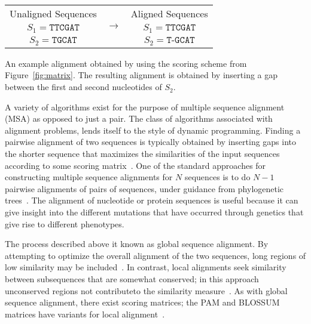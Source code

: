    
\begin{minipage}{\linewidth}
\centering
{} \label{tab:alignment}
\begin{tabular}{clc}
\multicolumn{1}{|l|}{Unaligned Sequences} & \multicolumn{1}{l|}{\multirow{3}{*}{$\rightarrow$}} & \multicolumn{1}{l|}{Aligned Sequences} \\ \cline{1-1} \cline{3-3} 
$S_1=\texttt{TTCGAT}$                     & \multicolumn{1}{l}{}                               & $S_1=\texttt{TTCGAT}$                  \\
$S_2=\texttt{TGCAT}$                      & \multicolumn{1}{l}{}                               & $S_2=\texttt{T-GCAT}$                 
\end{tabular}\par
{An example alignment obtained by using the scoring scheme from Figure~\ref{fig:matrix}. The resulting alignment is obtained by inserting a gap between the first and second nucleotides of $S_2$. }
\end{minipage}

A variety of algorithms exist for the purpose of multiple sequence alignment (MSA) as opposed to just a pair. The class of algorithms associated with alignment problems, lends itself to the style of dynamic programming. Finding a pairwise alignment of two sequences is typically obtained by inserting gaps into the shorter sequence that maximizes the similarities of the input sequences according to some scoring matrix~\cite{edgar2006multiple}. One of the standard approaches for constructing multiple sequence alignments for $N$ sequences is to do $N-1$ pairwise alignments of pairs of sequences, under guidance from phylogenetic trees~\cite{feng1987progressive}.
	The alignment of nucleotide or protein sequences is useful because it can give insight into the different mutations that have occurred through genetics that give rise to different phenotypes. 


The process described above it known as global sequence alignment. By attempting to optimize the overall alignment of the two sequences, long regions of low similarity may be included~\cite{needleman1970general}. In contrast, local alignments seek similarity between subsequences that are somewhat conserved; in this approach unconserved regions not  contributeto the similarity measure~\cite{goad1982pattern, sellers1984pattern, smith1981comparison}. As with global sequence alignment, there exist scoring matrices; the PAM and BLOSSUM matrices have variants for local alignment~\cite{mount2008comparison}. 
